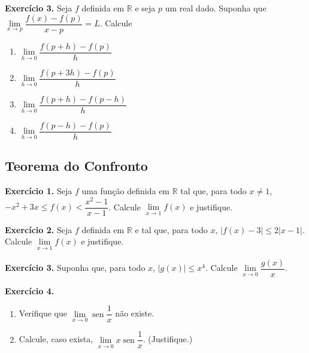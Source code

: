 \documentclass[12pt,a4paper]{article}
\begin{document}
\vspace{0.5cm}
\noindent\textbf{Exercício 3.} Seja $f$ definida em $\mathbb{R}$ e seja $p$ um real dado. Suponha que $\lim\limits_{x \to p} \dfrac{f(x) - f(p)}{x - p} = L$. Calcule
\begin{enumerate}
    \renewcommand{\theenumi}{\alph{enumi}}
    \renewcommand{\labelenumi}{\theenumi)}
    \item $\lim\limits_{h \to 0} \dfrac{f(p + h) - f(p)}{h}$
    \item $\lim\limits_{h \to 0} \dfrac{f(p + 3h) - f(p)}{h}$
    \item $\lim\limits_{h \to 0} \dfrac{f(p + h) - f(p - h)}{h}$
    \item $\lim\limits_{h \to 0} \dfrac{f(p - h) - f(p)}{h}$
\end{enumerate}

\subsection{Teorema do Confronto}
\vspace{0.5cm}
\noindent\textbf{Exercício 1.}
Seja $f$ uma função definida em $\mathbb{R}$ tal que, para todo $x \neq 1$, $-x^2 + 3x \le f(x) < \dfrac{x^2 - 1}{x - 1}$. Calcule $\lim\limits_{x \to 1} f(x)$ e justifique.

\vspace{0.5cm}
\noindent\textbf{Exercício 2.}
Seja $f$ definida em $\mathbb{R}$ e tal que, para todo $x$, $|f(x) - 3| \le 2|x - 1|$. Calcule $\lim\limits_{x \to 1} f(x)$ e justifique.

\vspace{0.5cm}
\noindent\textbf{Exercício 3.}
Suponha que, para todo $x$, $|g(x)| \le x^4$. Calcule $\lim\limits_{x \to 0} \dfrac{g(x)}{x}$.

\vspace{0.5cm}
\noindent\textbf{Exercício 4.}
\begin{enumerate}
    \renewcommand{\theenumi}{\alph{enumi}}
    \renewcommand{\labelenumi}{\theenumi)}
    \item Verifique que $\lim\limits_{x \to 0} \operatorname{sen}\dfrac{1}{x}$ não existe.
    \item Calcule, caso exista, $\lim\limits_{x \to 0} x\operatorname{sen}\dfrac{1}{x}$. (Justifique.)
\end{enumerate}
\end{document}
